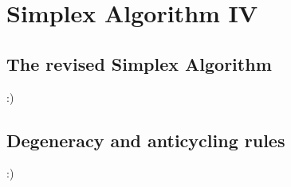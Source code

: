 \documentclass[main]{subfiles}
\begin{document}

\section{Simplex Algorithm IV}

\subsection{The revised Simplex Algorithm}
:)

\subsection{Degeneracy and anticycling rules}
:)
\end{document}
